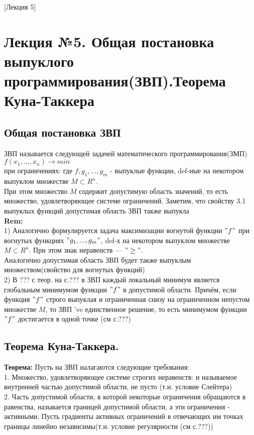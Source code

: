 [Лекция 5]


\section*{Лекция №5. Общая постановка выпуклого программирования(ЗВП).Теорема Куна-Таккера}
\subsection*{Общая постановка ЗВП}
ЗВП называется следующей задачей математического программирования(ЗМП)\\
$f(x_1,...,x_n) \rightarrow min$\\
при ограничениях:
где $f,g_1,...,g_m$ - выпуклые функции, def-ные на некотором выпуклом множестве $M\subset R^n$.\\
При этом множество $M$ содержит допустимую область значений, то есть множество, удовлетворяющее системе ограничений. Заметим, что свойству 3.1 выпуклых функций допустимая область ЗВП также выпукла \\
\textbf{Rem:}\\
1) Аналогично формулируется задача максимизации вогнутой функции $"f"$ при вогнутых функциях $"g_1,...,g_m"$, def-х на некотором выпуклом множестве $M\subset R^n$. При этом знак неравенств --- $"\geq"$.\\
Аналогично допустимая область ЗВП будет также выпуклым множеством(свойство для вогнутых функций)\\
2) В ??? с теор. на с.??? в ЗВП каждый локальный минимум является глобальным минимумом функции $"f"$ в допустимой области. Причём, если функция $"f"$ строго выпуклая и ограниченная снизу на ограниченном непустом множестве $M$, то ЗВП 've единственное решение, то есть минимумом функции $"f"$ достигается в одной точке
 (см с.???)
\newpage
\subsection*{Теорема Куна-Таккера.}
\textbf{Теорема:} Пусть на ЗВП налагаются следующие требования:\\
1. Множество, удовлетворяющее системе строгих неравенств:
и называемое внутренней частью допустимой области, не пусто (т.н. условие Слейтера) \\
2. Часть допустимой области, в которой некоторые ограничения обращаются в равенства, называется границей допустимой области, а эти ограничения - активными. Пусть градиенты активных ограничений в отвечающих им точках границы линейно независимы(т.н. условие регулярности (см с.???))\\
\newpage
